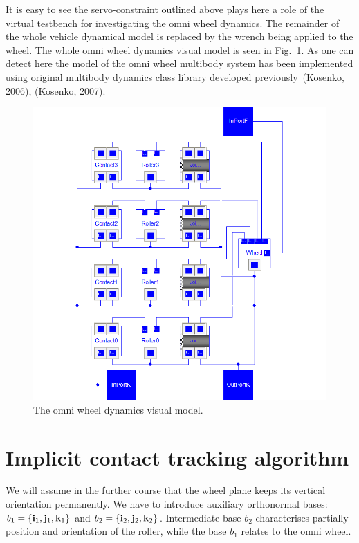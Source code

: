\documentclass{jsme-tj}
\begin{document}
It is easy to see the servo-constraint outlined above plays here a role of the 
virtual testbench for investigating the omni wheel dynamics. The remainder of 
the whole vehicle dynamical model is replaced by the wrench being applied to 
the wheel. The whole omni wheel dynamics visual model is seen in
Fig.~\ref{VisualModel}. As one can detect here the model of the omni wheel 
multibody system has been implemented using original multibody dynamics class 
library developed previously~(Kosenko, 2006), (Kosenko, 2007).

\begin{figure}[ht]
\begin{center}
\includegraphics[bb= 0 0 19.50cm 20cm,scale=0.63]{OmniWheelModel.png}
\caption{The omni wheel dynamics visual model.}
\end{center}
\label{VisualModel}
\end{figure}

\section{Implicit contact tracking algorithm}

We will assume in the further course that the wheel plane keeps its vertical 
orientation permanently. We have to introduce auxiliary orthonormal bases:
$b_1=\{ {\bf i}_1,{\bf j}_1,{\bf k}_1\} $ and 
$b_2=\{ {\bf i}_2,{\bf j}_2,{\bf k}_2\} $. Intermediate base $b_2$ 
characterises partially position and orientation of the roller, while the base
$b_1$ relates to the omni wheel.
\end{document}
